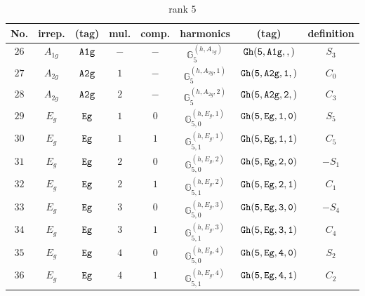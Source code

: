 \documentclass[fleqn,8pt]{jsarticle}
\begin{document}
\begin{table}[ht!]
\begin{center}
\caption{rank 5}
\renewcommand{\arraystretch}{1.3}
\begin{tabular}{cccccccc} \hline \hline
No. & irrep. & (tag) & mul. & comp. & harmonics & (tag) & definition \\ \hline
$ 26 $ & $ A_{1g} $ & $ {\tt A1g} $ & $ - $ & $ - $ & $ \mathbb{G}_{5}^{(h,A_{1g})} $ & $ {\tt Gh(5,A1g,,)} $ & $ S_{3} $ \\
$ 27 $ & $ A_{2g} $ & $ {\tt A2g} $ & $ 1 $ & $ - $ & $ \mathbb{G}_{5}^{(h,A_{2g},1)} $ & $ {\tt Gh(5,A2g,1,)} $ & $ C_{0} $ \\
$ 28 $ & $ A_{2g} $ & $ {\tt A2g} $ & $ 2 $ & $ - $ & $ \mathbb{G}_{5}^{(h,A_{2g},2)} $ & $ {\tt Gh(5,A2g,2,)} $ & $ C_{3} $ \\
$ 29 $ & $ E_{g} $ & $ {\tt Eg} $ & $ 1 $ & $ 0 $ & $ \mathbb{G}_{5,0}^{(h,E_{g},1)} $ & $ {\tt Gh(5,Eg,1,0)} $ & $ S_{5} $ \\
$ 30 $ & $ E_{g} $ & $ {\tt Eg} $ & $ 1 $ & $ 1 $ & $ \mathbb{G}_{5,1}^{(h,E_{g},1)} $ & $ {\tt Gh(5,Eg,1,1)} $ & $ C_{5} $ \\
$ 31 $ & $ E_{g} $ & $ {\tt Eg} $ & $ 2 $ & $ 0 $ & $ \mathbb{G}_{5,0}^{(h,E_{g},2)} $ & $ {\tt Gh(5,Eg,2,0)} $ & $ - S_{1} $ \\
$ 32 $ & $ E_{g} $ & $ {\tt Eg} $ & $ 2 $ & $ 1 $ & $ \mathbb{G}_{5,1}^{(h,E_{g},2)} $ & $ {\tt Gh(5,Eg,2,1)} $ & $ C_{1} $ \\
$ 33 $ & $ E_{g} $ & $ {\tt Eg} $ & $ 3 $ & $ 0 $ & $ \mathbb{G}_{5,0}^{(h,E_{g},3)} $ & $ {\tt Gh(5,Eg,3,0)} $ & $ - S_{4} $ \\
$ 34 $ & $ E_{g} $ & $ {\tt Eg} $ & $ 3 $ & $ 1 $ & $ \mathbb{G}_{5,1}^{(h,E_{g},3)} $ & $ {\tt Gh(5,Eg,3,1)} $ & $ C_{4} $ \\
$ 35 $ & $ E_{g} $ & $ {\tt Eg} $ & $ 4 $ & $ 0 $ & $ \mathbb{G}_{5,0}^{(h,E_{g},4)} $ & $ {\tt Gh(5,Eg,4,0)} $ & $ S_{2} $ \\
$ 36 $ & $ E_{g} $ & $ {\tt Eg} $ & $ 4 $ & $ 1 $ & $ \mathbb{G}_{5,1}^{(h,E_{g},4)} $ & $ {\tt Gh(5,Eg,4,1)} $ & $ C_{2} $ \\
 \hline \hline
\end{tabular}
\end{center}
\end{table}
\end{document}
